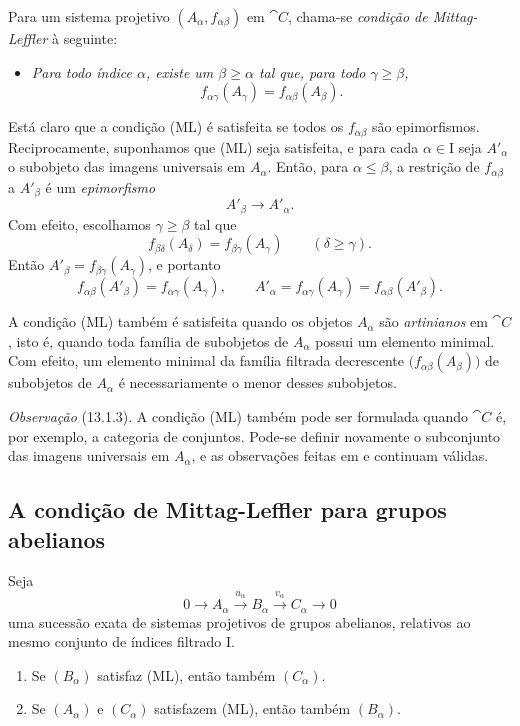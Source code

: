 \begin{env}[13.1.2]
\label{0.13.1.2}
Para um sistema projetivo $(A_\alpha,f_{\alpha\beta})$ em $\cat{C}$,
chama-se \emph{condição de Mittag-Leffler} à seguinte:
\begin{itemize}
  \item[\textbf{(ML)}]
  \emph{Para todo índice $\alpha$, existe um $\beta\geq\alpha$ tal
  que, para todo $\gamma\geq\beta$,}
  \[
    f_{\alpha\gamma}(A_\gamma)
    =
    f_{\alpha\beta}(A_\beta).
  \]
\end{itemize}

Está claro que a condição (ML) é satisfeita se todos os
$f_{\alpha\beta}$ são epimorfismos.
Reciprocamente, suponhamos que (ML) seja satisfeita, e para cada
$\alpha\in\mathrm{I}$ seja $A'_\alpha$ o subobjeto das imagens
universais em $A_\alpha$.
Então, para $\alpha\leq\beta$, a restrição de
$f_{\alpha\beta}$ a $A'_\beta$ é um \emph{epimorfismo}
\[
  A'_\beta\longrightarrow A'_\alpha.
\]
Com efeito, escolhamos $\gamma\geq\beta$ tal que
\[
  f_{\beta\delta}(A_\delta)
  =
  f_{\beta\gamma}(A_\gamma)
  \qquad(\delta\geq\gamma).
\]
Então $A'_\beta=f_{\beta\gamma}(A_\gamma)$, e portanto
\[
  f_{\alpha\beta}(A'_\beta)
  =
  f_{\alpha\gamma}(A_\gamma),
  \qquad
  A'_\alpha
  =
  f_{\alpha\gamma}(A_\gamma)
  =
  f_{\alpha\beta}(A'_\beta).
\]

A condição (ML) também é satisfeita quando os objetos $A_\alpha$ são
\emph{artinianos} em $\cat{C}$, isto é, quando toda família de
subobjetos de $A_\alpha$ possui um elemento minimal.
Com efeito, um elemento minimal da família filtrada decrescente
$\bigl(f_{\alpha\beta}(A_\beta)\bigr)$ de subobjetos de $A_\alpha$
é necessariamente o menor desses subobjetos.
\end{env}

\begin{env}[13.1.3]
\label{0.13.1.3}
\emph{Observação} (13.1.3).
A condição (ML) também pode ser formulada quando $\cat{C}$ é, por
exemplo, a categoria de conjuntos.
Pode-se definir novamente o subconjunto das imagens universais em
$A_\alpha$, e as observações feitas em  e
 continuam válidas.
\end{env}

\subsection{A condição de Mittag-Leffler para grupos abelianos}
\label{subsection:0.13.2}

\begin{proposition}[13.2.1]
\label{0.13.2.1}
Seja
\[
  0\longrightarrow A_\alpha
  \xrightarrow{u_\alpha}B_\alpha
  \xrightarrow{v_\alpha}C_\alpha
  \longrightarrow0
\]
uma sucessão exata de sistemas projetivos de grupos abelianos, relativos
ao mesmo conjunto de índices filtrado $\mathrm{I}$.
\begin{enumerate}
  \item[{\rm(i)}]
  Se $(B_\alpha)$ satisfaz {\rm(ML)}, então também $(C_\alpha)$.
  \item[{\rm(ii)}]
  Se $(A_\alpha)$ e $(C_\alpha)$ satisfazem {\rm(ML)}, então também
  $(B_\alpha)$.
\end{enumerate}
\end{proposition}

